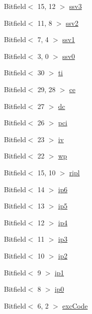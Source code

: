 \begin{DoxyCompactItemize}
\item 
Bitfield$<$ 15, 12 $>$ \hyperlink{namespaceMipsISA_ad07d43a251b612c0f3414306ba2e1adb}{ssv3}
\item 
Bitfield$<$ 11, 8 $>$ \hyperlink{namespaceMipsISA_a921a7c966e36af946780186628847a96}{ssv2}
\item 
Bitfield$<$ 7, 4 $>$ \hyperlink{namespaceMipsISA_a650947ee9226baa77ac0b0acd6a78b69}{ssv1}
\item 
Bitfield$<$ 3, 0 $>$ \hyperlink{namespaceMipsISA_a49db28596c2df4fe5b9d4ed4b26c4b6c}{ssv0}
\item 
Bitfield$<$ 30 $>$ \hyperlink{namespaceMipsISA_a0e507c9f0ce51c01af3f6dd3fd0b09eb}{ti}
\item 
Bitfield$<$ 29, 28 $>$ \hyperlink{namespaceMipsISA_a5e7d4c894937b23c448e900d42f68004}{ce}
\item 
Bitfield$<$ 27 $>$ \hyperlink{namespaceMipsISA_a3378402e88a21fedf7508e8813c78aa4}{dc}
\item 
Bitfield$<$ 26 $>$ \hyperlink{namespaceMipsISA_a81f915cca01627a868c85617a0a43f4e}{pci}
\item 
Bitfield$<$ 23 $>$ \hyperlink{namespaceMipsISA_a9d394333dd818fb73be38d6b183251c6}{iv}
\item 
Bitfield$<$ 22 $>$ \hyperlink{namespaceMipsISA_a4dc00165209bd1b13208d6d91ea7470e}{wp}
\item 
Bitfield$<$ 15, 10 $>$ \hyperlink{namespaceMipsISA_a7937fe1cd8313fe2e339b7aecb470d0e}{ripl}
\item 
Bitfield$<$ 14 $>$ \hyperlink{namespaceMipsISA_a4c627576c8807b5e6378b05b8d3b7489}{ip6}
\item 
Bitfield$<$ 13 $>$ \hyperlink{namespaceMipsISA_aaac0a5f54f306faa11a8bcb2047e9aae}{ip5}
\item 
Bitfield$<$ 12 $>$ \hyperlink{namespaceMipsISA_a09aa88834584b881ca1385625e021f19}{ip4}
\item 
Bitfield$<$ 11 $>$ \hyperlink{namespaceMipsISA_aeb6e77fe16427c7a03fcb46143dd59e2}{ip3}
\item 
Bitfield$<$ 10 $>$ \hyperlink{namespaceMipsISA_a3645e2bcbe2113f2bfae96a465341e21}{ip2}
\item 
Bitfield$<$ 9 $>$ \hyperlink{namespaceMipsISA_a4cc515c1b1f1020de00c9a1d413db416}{ip1}
\item 
Bitfield$<$ 8 $>$ \hyperlink{namespaceMipsISA_aa8a7a315aa00c6e4bfb0219c44dc19a3}{ip0}
\item 
Bitfield$<$ 6, 2 $>$ \hyperlink{namespaceMipsISA_a9125816703baa612f861e8efd7a5d567}{excCode}
\item 

\end{DoxyCompactItemize}
